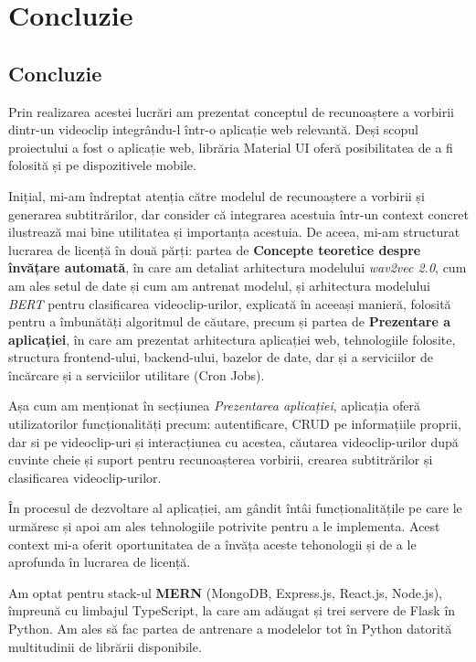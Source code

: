 \chapter{Concluzie}

\section{Concluzie}
Prin realizarea acestei lucrări am prezentat conceptul de recunoaștere a vorbirii dintr-un videoclip 
integrându-l într-o aplicație web relevantă. Deși scopul proiectului a fost o aplicație web,
librăria Material UI oferă posibilitatea de a fi folosită și pe dispozitivele mobile.
\par
Inițial, mi-am îndreptat atenția către modelul de recunoaștere a vorbirii și generarea subtitrărilor,
dar consider că  integrarea acestuia într-un context concret ilustrează mai bine utilitatea și
importanța acestuia. De aceea, mi-am structurat lucrarea de licență în două părți: partea de
\textbf{Concepte teoretice despre învățare automată}, în care am detaliat arhitectura modelului \textit{wav2vec 2.0},
cum am ales setul de date și cum am antrenat modelul, și arhitectura modelului \textit{BERT}
pentru clasificarea videoclip-urilor, explicată în aceeași manieră, folosită pentru a îmbunătăți
algoritmul de căutare, precum și partea de \textbf{Prezentare a aplicației}, în care am prezentat arhitectura
aplicației web, tehnologiile folosite, structura frontend-ului, backend-ului, bazelor de date,
dar și a serviciilor de încărcare și a serviciilor utilitare (Cron Jobs).
\par
Așa cum am menționat în secțiunea \textit{Prezentarea aplicației}, aplicația oferă utilizatorilor
funcționalități precum: autentificare, CRUD pe informațiile proprii, dar si pe videoclip-uri și
interacțiunea cu acestea, căutarea videoclip-urilor după cuvinte cheie și suport pentru recunoașterea
vorbirii, crearea subtitrărilor și clasificarea videoclip-urilor.
\par
În procesul de dezvoltare al aplicației, am gândit întâi funcționalitățile pe care le urmăresc
și apoi am ales tehnologiile potrivite pentru a le implementa. Acest context mi-a oferit 
oportunitatea de a învăța aceste tehonologii și de a le aprofunda în lucrarea de licență.
\par
Am optat pentru stack-ul \textbf{MERN} (MongoDB, Express.js, React.js, Node.js), împreună cu 
limbajul TypeScript, la care am adăugat și trei servere de Flask în Python. Am ales să fac partea
de antrenare a modelelor tot în Python datorită multitudinii de librării disponibile.

